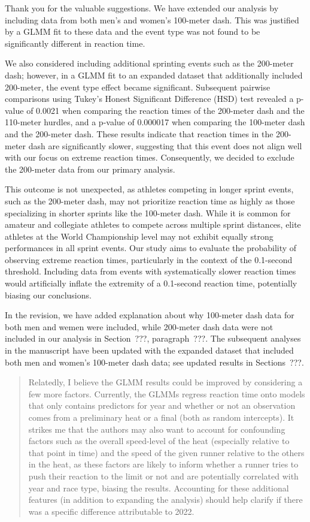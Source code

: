 \documentclass[12pt]{article}
\newenvironment{comment}%
{\begin{quotation}\noindent\small\it\color{darkblue}\ignorespaces%
}{\end{quotation}}
\begin{document}
Thank you for the valuable suggestions. We have extended our analysis
by including data from both men's and women's 100-meter dash. This was
justified by a GLMM fit to these data and the event type was not found
to be significantly different in reaction time.


We also considered including additional sprinting events such as the
200-meter dash; however, in a GLMM fit to an expanded dataset that
additionally included 200-meter, the event type effect became
significant. Subsequent pairwise comparisons using Tukey’s Honest
Significant Difference (HSD) test revealed a p-value of 0.0021 when
comparing the reaction times of the 200-meter dash and the 110-meter
hurdles, and a p-value of 0.000017 when comparing the 100-meter dash
and the 200-meter dash. These results indicate that reaction times in
the 200-meter dash are significantly slower, suggesting that this
event does not align well with our focus on extreme reaction times.
Consequently, we decided to exclude the 200-meter data from our
primary analysis.


This outcome is not unexpected, as athletes competing in longer sprint
events, such as the 200-meter dash, may not prioritize reaction time
as highly as those specializing in shorter sprints like the 100-meter
dash. While it is common for amateur and collegiate athletes to
compete across multiple sprint distances, elite athletes at the World
Championship level may not exhibit equally strong performances in all
sprint events. Our study aims to evaluate the probability of observing
extreme reaction times, particularly in the context of the 0.1-second
threshold. Including data from events with systematically slower
reaction times would artificially inflate the extremity of a
0.1-second reaction time, potentially biasing our conclusions.


In the revision, we have added explanation about why 100-meter dash
data for both men and wemen were included, while 200-meter dash data
were not included in our analysis in Section~???, paragraph~???.
The subsequent analyses in the manuscript have been updated with the
expanded dataset that included both men and women's 100-meter dash
data; see updated results in Sections~???.


\begin{comment}
Relatedly, I believe the GLMM results could be improved by considering a few
more factors. Currently, the GLMMs regress reaction time onto models that only
contains predictors for year and whether or not an observation comes from a
preliminary heat or a final (both as random intercepts). It strikes me that the
authors may also want to account for confounding factors such as the overall
speed-level of the heat (especially relative to that point in time) and the
speed of the given runner relative to the others in the heat, as these factors
are likely to inform whether a runner tries to push their reaction to the limit
or not and are potentially correlated with year and race type, biasing the
results. Accounting for these additional features (in addition to expanding the
analysis) should help clarify if there was a specific difference attributable to
2022.
\end{comment} 
\end{document}
